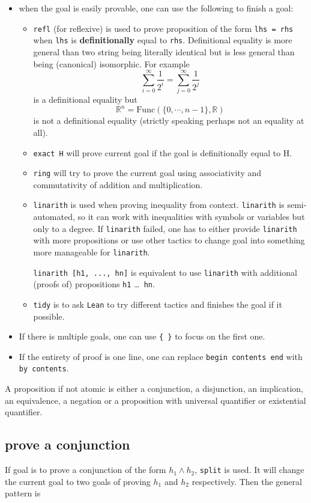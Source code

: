 \documentclass{report}
\theoremstyle{definition}
\theoremstyle{plain}
\begin{document}
\begin{itemize}
  \item when the goal is easily provable, one can use the following to finish a goal:
  \begin{itemize}
    \item {\tt refl} (for reflexive) is used to prove proposition of the form {\tt lhs = rhs} when {\tt lhs} is {\bf definitionally} equal to {\tt rhs}. Definitional equality is more general than two string being literally identical but is less general than being (canonical) isomorphic. For example
    $$
  \sum_{i=0}^\infty \frac{1}{2^i}=\sum_{j=0}^\infty \frac{1}{2^j}
    $$
    is a definitional equality but
    $$
  \mathbb R^n = \mathrm{Func}\left(\{0,\cdots, n-1\},\mathbb R\right)
    $$ is not a definitional equality (strictly speaking perhaps not an equality at all).
    \item {\tt exact H} will prove current goal if the goal is definitionally equal to H. 
  
    \item {\tt ring} will try to prove the current goal using associativity and commutativity of addition and multiplication.
    \item {\tt linarith} is used when proving inequality from context. {\tt linarith} is semi-automated, so it can work with inequalities with symbols or variables but only to a degree. If {\tt linarith} failed, one has to either provide {\tt linarith} with more propositions or use other tactics to change goal into something more manageable for {\tt linarith}.
  
    {\tt linarith [h1, ..., hn]} is equivalent to use {\tt linarith} with additional (proofs of) propositions {\tt h1} \dots {\tt { hn}}.
    \item {\tt tidy} is to ask {\tt Lean} to try different tactics and finishes the goal if it possible.
  \end{itemize}

  \item If there is multiple goals, one can use {\tt \{ \}} to focus on the first one.
  \item If the entirety of proof is one line, one can replace {\tt begin contents end} with {\tt by contents}.
\end{itemize}


A proposition if not atomic is either a conjunction, a disjunction, an implication, an equivalence, a negation or a proposition with universal quantifier or existential quantifier.

\subsection*{prove a conjunction}\label{lean:conj}
If goal is to prove a conjunction of the form $h_1 \land h_2$, {\tt split} is used. It will change the current goal to two goals of proving $h_1$ and $h_2$ respectively. Then the general pattern is
\end{document}
